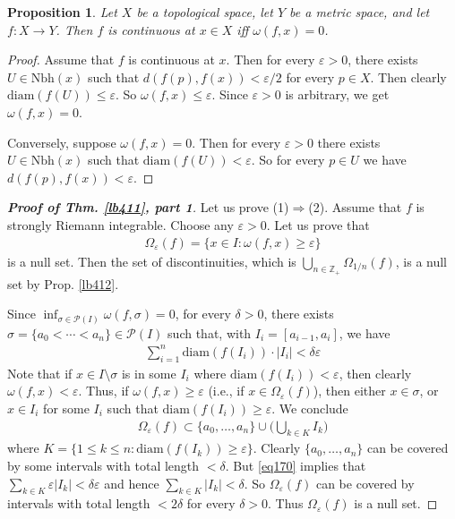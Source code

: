 \documentclass[12pt,b5paper,notitlepage]{article}
\theoremstyle{definition}
\theoremstyle{plain}
\newtheorem{pp}[df]{Proposition}
\newcommand{\mc}{\mathcal}
\newcommand{\Zbb}{\mathbb Z}
\newcommand{\Nbh}{\mathrm{Nbh}}
\newcommand{\diam}{\mathrm{diam}}
\newcommand{\eps}{\varepsilon}
\numberwithin{equation}{section}
\begin{document}
\begin{pp}
Let $X$ be a topological space, let $Y$ be a metric space, and let $f:X\rightarrow Y$. Then  $f$ is continuous at $x\in X$ iff $\omega(f,x)=0$.
\end{pp}


\begin{proof}
Assume that $f$ is continuous at $x$. Then for every $\eps>0$, there exists $U\in\Nbh(x)$ such that $d(f(p),f(x))<\eps/2$ for every $p\in X$. Then clearly $\diam(f(U))\leq\eps$. So $\omega(f,x)\leq \eps$. Since $\eps>0$ is arbitrary, we get $\omega(f,x)=0$.

Conversely, suppose $\omega(f,x)=0$. Then for every $\eps>0$ there exists $U\in\Nbh(x)$ such that $\diam(f(U))<\eps$. So for every $p\in U$ we have $d(f(p),f(x))<\eps$.
\end{proof}



\begin{proof}[\textbf{Proof of Thm. \ref{lb411}, part 1}]
Let us prove (1)$\Rightarrow$(2). Assume that $f$ is strongly Riemann integrable. Choose any $\eps>0$. Let us prove that
\begin{align}
\Omega_\eps(f)=\{x\in I:\omega(f,x)\geq\eps\}
\end{align}
is a null set. Then the set of discontinuities, which is $\bigcup_{n\in\Zbb_+}\Omega_{1/n}(f)$, is a null set by Prop. \ref{lb412}.

Since $\inf_{\sigma\in\mc P(I)}\omega(f,\sigma)=0$, for every $\delta>0$, there exists $\sigma=\{a_0<\cdots<a_n\}\in\mc P(I)$ such that, with $I_i=[a_{i-1},a_i]$, we have 
\begin{align}
\sum_{i=1}^n \diam(f(I_i))\cdot |I_i|<\delta\eps\label{eq170}
\end{align}
Note that if $x\in I\setminus\sigma$ is in some $I_i$ where $\diam(f(I_i))<\eps$, then clearly $\omega(f,x)<\eps$. Thus, if $\omega(f,x)\geq \eps$ (i.e., if $x\in\Omega_\eps(f)$), then either $x\in\sigma$, or $x\in I_i$ for some $I_i$ such that $\diam(f(I_i))\geq\eps$. We conclude
\begin{align*}
\Omega_\eps(f)\subset\{a_0,\dots,a_n\}\cup\Big(\bigcup_{k\in K}I_k\Big)
\end{align*}
where $K=\{1\leq k\leq n:\diam(f(I_k))\geq\eps\}$. Clearly $\{a_0,\dots,a_n\}$ can be covered by some intervals with total length $<\delta$. But \eqref{eq170} implies that $\sum_{k\in K}\eps|I_k|<\delta\eps$ and hence $\sum_{k\in K}|I_k|<\delta$. So $\Omega_\eps(f)$ can be covered by intervals with total length $<2\delta$ for every $\delta>0$. Thus $\Omega_\eps(f)$ is a null set.
\end{proof}
\end{document}
